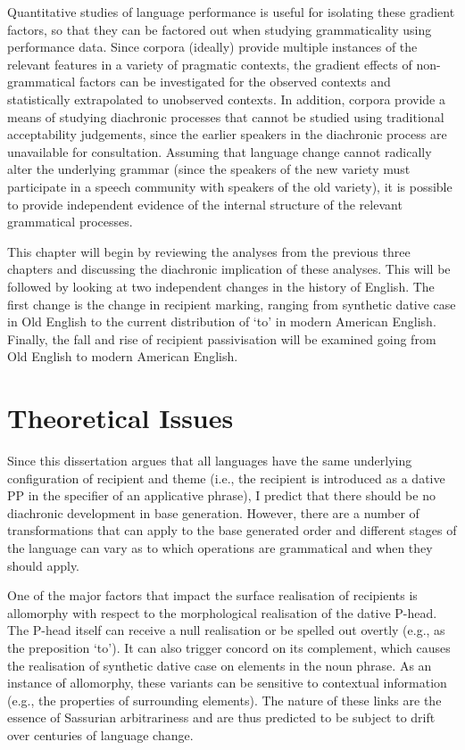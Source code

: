 Quantitative studies of language performance is useful for isolating these gradient factors, so that they can be factored out when studying grammaticality using performance data. Since corpora (ideally) provide multiple instances of the relevant features in a variety of pragmatic contexts, the gradient effects of non-grammatical factors can be investigated for the observed contexts and statistically extrapolated to unobserved contexts. In addition, corpora provide a means of studying diachronic processes that cannot be studied using traditional acceptability judgements, since the earlier speakers in the diachronic process are unavailable for consultation. Assuming that language change cannot radically alter the underlying grammar (since the speakers of the new variety must participate in a speech community with speakers of the old variety), it is possible to provide independent evidence of the internal structure of the relevant grammatical processes.

This chapter will begin by reviewing the analyses from the previous three chapters and discussing the diachronic implication of these analyses. This will be followed by looking at two independent changes in the history of English. The first change is the change in recipient marking, ranging from synthetic dative case in Old English to the current distribution of `to' in modern American English. Finally, the fall and rise of recipient passivisation will be examined going from Old English to modern American English.

\section{Theoretical Issues}
	Since this dissertation argues that all languages have the same underlying configuration of recipient and theme (i.e., the recipient is introduced as a dative PP in the specifier of an applicative phrase), I predict that there should be no diachronic development in base generation. However, there are a number of transformations that can apply to the base generated order and different stages of the language can vary as to which operations are grammatical and when they should apply.

	One of the major factors that impact the surface realisation of recipients is allomorphy with respect to the morphological realisation of the dative P-head. The P-head itself can receive a null realisation or be spelled out overtly (e.g., as the preposition `to'). It can also trigger concord on its complement, which causes the realisation of synthetic dative case on elements in the noun phrase. As an instance of allomorphy, these variants can be sensitive to contextual information (e.g., the properties of surrounding elements). The nature of these links are the essence of Sassurian arbitrariness and are thus predicted to be subject to drift over centuries of language change.

